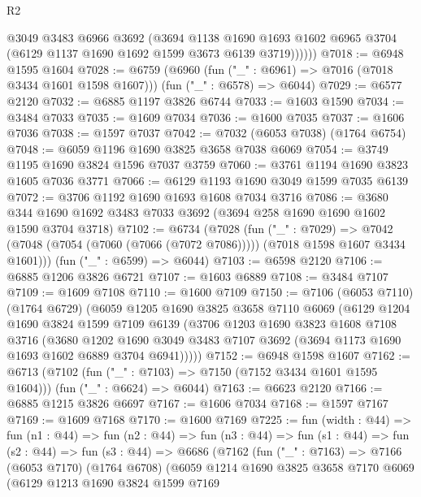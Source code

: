 \begin{lexlean}{R2}
\begin{coremodule}
            @3049
            @3483
            @6966
            @3692
            (@3694
              @1138
              @1690
              @1693
              @1602
              @6965
              @3704
              (@6129 @1137 @1690 @1692 @1599 @3673 @6139 @3719))))))
@7018 := @6948 @1595 @1604
@7028 := @6759
    (@6960 (fun ("_" : @6961) => @7016 (@7018 @3434 @1601 @1598 @1607)))
    (fun ("_" : @6578) => @6044)
@7029 := @6577 @2120
@7032 := @6885 @1197 @3826 @6744
@7033 := @1603 @1590
@7034 := @3484 @7033
@7035 := @1609 @7034
@7036 := @1600 @7035
@7037 := @1606 @7036
@7038 := @1597 @7037
@7042 := @7032 (@6053 @7038) (@1764 @6754)
@7048 := @6059 @1196 @1690 @3825 @3658 @7038 @6069
@7054 := @3749 @1195 @1690 @3824 @1596 @7037 @3759
@7060 := @3761 @1194 @1690 @3823 @1605 @7036 @3771
@7066 := @6129 @1193 @1690 @3049 @1599 @7035 @6139
@7072 := @3706 @1192 @1690 @1693 @1608 @7034 @3716
@7086 := @3680 @344 @1690 @1692 @3483 @7033 @3692 (@3694 @258 @1690 @1690 @1602 @1590 @3704 @3718)
@7102 := @6734
    (@7028
      (fun ("_" : @7029) =>
      @7042 (@7048 (@7054 (@7060 (@7066 (@7072 @7086))))) (@7018 @1598 @1607 @3434 @1601)))
    (fun ("_" : @6599) => @6044)
@7103 := @6598 @2120
@7106 := @6885 @1206 @3826 @6721
@7107 := @1603 @6889
@7108 := @3484 @7107
@7109 := @1609 @7108
@7110 := @1600 @7109
@7150 := @7106
    (@6053 @7110)
    (@1764 @6729)
    (@6059
      @1205
      @1690
      @3825
      @3658
      @7110
      @6069
      (@6129
        @1204
        @1690
        @3824
        @1599
        @7109
        @6139
        (@3706
          @1203
          @1690
          @3823
          @1608
          @7108
          @3716
          (@3680
            @1202
            @1690
            @3049
            @3483
            @7107
            @3692
            (@3694 @1173 @1690 @1693 @1602 @6889 @3704 @6941)))))
@7152 := @6948 @1598 @1607
@7162 := @6713
    (@7102 (fun ("_" : @7103) => @7150 (@7152 @3434 @1601 @1595 @1604)))
    (fun ("_" : @6624) => @6044)
@7163 := @6623 @2120
@7166 := @6885 @1215 @3826 @6697
@7167 := @1606 @7034
@7168 := @1597 @7167
@7169 := @1609 @7168
@7170 := @1600 @7169
@7225 := fun (width : @44) =>
  fun (n1 : @44) =>
  fun (n2 : @44) =>
  fun (n3 : @44) =>
  fun (s1 : @44) =>
  fun (s2 : @44) =>
  fun (s3 : @44) =>
  @6686
    (@7162
      (fun ("_" : @7163) =>
      @7166
        (@6053 @7170)
        (@1764 @6708)
        (@6059
          @1214
          @1690
          @3825
          @3658
          @7170
          @6069
          (@6129
            @1213
            @1690
            @3824
            @1599
            @7169

\end{coremodule}
\end{lexlean}
